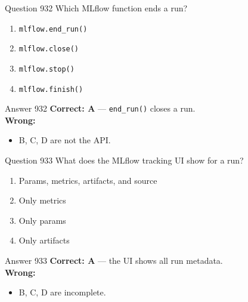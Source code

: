 \documentclass[aspectratio=169,11pt]{beamer}
\begin{document}
	\begin{frame}{Question 932}
		Which MLflow function ends a run?
		\begin{enumerate}[label=\Alph*.]
			\item \texttt{mlflow.end\_run()}
			\item \texttt{mlflow.close()}
			\item \texttt{mlflow.stop()}
			\item \texttt{mlflow.finish()}
		\end{enumerate}
	\end{frame}
	\begin{frame}{Answer 932}
		\textbf{Correct: A} --- \texttt{end\_run()} closes a run.\\
		\vspace{0.5em}
		\textbf{Wrong:}
		\begin{itemize}
			\item B, C, D are not the API.
		\end{itemize}
	\end{frame}
	
	\begin{frame}{Question 933}
		What does the MLflow tracking UI show for a run?
		\begin{enumerate}[label=\Alph*.]
			\item Params, metrics, artifacts, and source
			\item Only metrics
			\item Only params
			\item Only artifacts
		\end{enumerate}
	\end{frame}
	\begin{frame}{Answer 933}
		\textbf{Correct: A} --- the UI shows all run metadata.\\
		\vspace{0.5em}
		\textbf{Wrong:}
		\begin{itemize}
			\item B, C, D are incomplete.
		\end{itemize}
	\end{frame}
	
\end{document}
